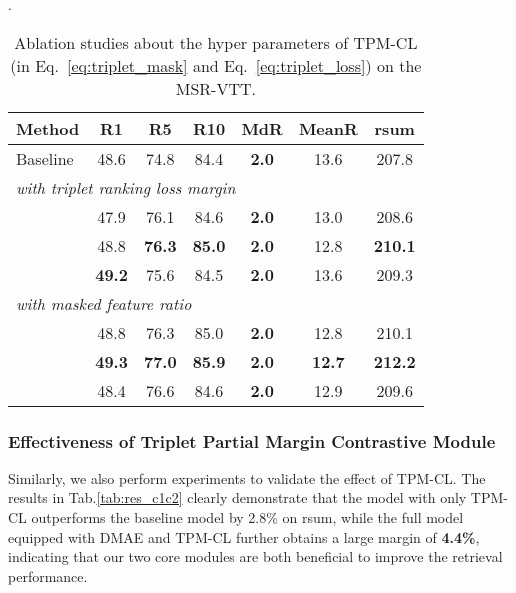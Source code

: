 \documentclass[sigconf]{acmart}
\begin{document}
\begin{table}[]
    \centering
    \caption{Ablation studies about the hyper parameters of TPM-CL (in Eq.~\ref{eq:triplet_mask} and Eq.~\ref{eq:triplet_loss}) on the MSR-VTT.}.
    \label{tab:hyper_TPM-CL}
    \renewcommand{\arraystretch}{0.8}\setlength\tabcolsep{2pt}\begin{tabular}{l| c c c c c c}
        \toprule
        {Method} & {R1} & {R5} & {R10} & {MdR} & {MeanR} & {rsum} \\ 
        \toprule
        {Baseline} &48.6 &74.8	&84.4	&\textbf{2.0} &13.6	&207.8 \\ 
        \midrule
        \multicolumn{7}{l}{\textit{with triplet ranking loss margin }} \\  
        {} &47.9	&76.1 &84.6	&\textbf{2.0}	&13.0	&208.6 \\
{} &48.8  &\textbf{76.3} &\textbf{85.0} &\textbf{2.0}    &12.8   &\textbf{210.1} \\  
{} &\textbf{49.2}  &75.6 &84.5 &\textbf{2.0}    &13.6   &209.3 \\  
        \midrule
        \multicolumn{7}{l}{\textit{with masked feature ratio }} \\  
        {} &48.8	&76.3	&85.0	&\textbf{2.0}	&12.8	&210.1 \\
{} &\textbf{49.3} &\textbf{77.0} &\textbf{85.9} &\textbf{2.0} &\textbf{12.7}	&\textbf{212.2} \\ 
{} &48.4    &76.6   &84.6   &\textbf{2.0}   &12.9   &209.6 \\ 
        \bottomrule
    \end{tabular}
\end{table}



\subsubsection{Effectiveness of Triplet Partial Margin Contrastive Module}
 Similarly, we also perform experiments to validate the effect of TPM-CL. The results in Tab.\ref{tab:res_c1c2} clearly demonstrate that the model with only TPM-CL outperforms the baseline model by 2.8\% on rsum, while the full model equipped with DMAE and TPM-CL further obtains a large margin of \textbf{4.4\%}, indicating that our two core modules are both beneficial to improve the retrieval performance.
\end{document}
